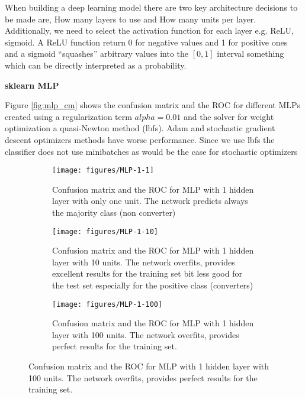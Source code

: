 \documentclass[11pt]{article}
\theoremstyle{definition}
\theoremstyle{remark}
\begin{document}
{When building a deep learning model there are two key architecture decisions to be made are, How many layers to use and How many units per layer. Additionally, we need to select the activation function for each layer e.g. ReLU, sigmoid. A ReLU function return 0 for negative values and 1 for positive ones and a sigmoid “squashes” arbitrary values into the $[0, 1]$ interval something which can be directly interpreted as a probability.

\textbf{sklearn MLP}

Figure \ref{fig:mlp_cm} shows the confusion matrix and the ROC for different MLPs created using a regularization term $alpha = 0.01$ and the solver for weight optimization a quasi-Newton method (lbfs). Adam and stochastic gradient descent optimizers methods have worse performance. Since we use lbfs the classifier does not use minibatches as would be the case for stochastic optimizers


\begin{figure}[H]
    \centering
    \begin{subfigure}[t]{1\textwidth}
        \centering
        \texttt{[image: figures/MLP-1-1]}
        \caption{Confusion matrix and the ROC for MLP with 1 hidden layer with only one unit. The network predicts always the majority class (non converter)}
    \end{subfigure}

    \begin{subfigure}[t]{1\textwidth}
        \centering
        \texttt{[image: figures/MLP-1-10]}
        \caption{Confusion matrix and the ROC for MLP with 1 hidden layer with 10 units. The network overfits, provides excellent results for the training set bit less good for the test set especially for the positive class (converters)}
    \end{subfigure}%

    \begin{subfigure}[t]{1\textwidth}
        \centering
        \texttt{[image: figures/MLP-1-100]}
        \caption{Confusion matrix and the ROC for MLP with 1 hidden layer with 100 units. The network overfits, provides perfect results for the training set.}
    \end{subfigure}%


\end{figure}}
\end{document}
